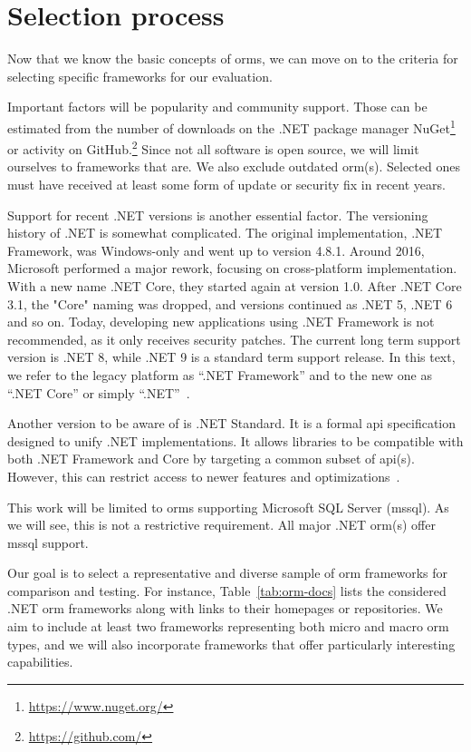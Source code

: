 \section{Selection process}
Now that we know the basic concepts of \acrshort{orm}s, we can move on to the criteria for selecting specific frameworks for our evaluation.

Important factors will be popularity and community support. Those can be estimated from the number of downloads on the .NET package manager NuGet\footnote{\url{https://www.nuget.org/}} or activity on GitHub.\footnote{\url{https://github.com/}} Since not all software is open source, we will limit ourselves to frameworks that are. We also  exclude outdated \acrshort{orm}(s). Selected ones must have received at least some form of update or security fix in recent years.

Support for recent .NET versions is another essential factor. The versioning history of .NET is somewhat complicated. The original implementation, .NET Framework, was Windows-only and went up to version 4.8.1. Around 2016, Microsoft performed a major rework, focusing on cross-platform implementation. With a new name .NET Core, they started again at version 1.0. After .NET Core 3.1, the "Core" naming was dropped, and versions continued as .NET 5, .NET 6 and so on. Today, developing new applications using .NET Framework is not recommended, as it only receives security patches. The current long term support version is .NET 8, while .NET 9 is a standard term support release. In this text, we refer to the legacy platform as ``.NET Framework'' and to the new one as ``.NET Core'' or simply ``.NET''~\cite{NETFrameworkVersions,NETversions}.

Another version to be aware of is .NET Standard. It is a formal \acrshort{api} specification designed to unify .NET implementations. It allows libraries to be compatible with both .NET Framework and Core by targeting a common subset of \acrshort{api}(s). However, this can restrict access to newer features and optimizations~\cite{NETStandard}.

This work will be limited to \acrshort{orm}s supporting Microsoft SQL Server (\acrshort{mssql}). As we will see, this is not a restrictive requirement. All major .NET \acrshort{orm}(s) offer \acrshort{mssql} support.

Our goal is to select a representative and diverse sample of \acrshort{orm} frameworks for comparison and testing. For instance, Table~\ref{tab:orm-docs} lists the considered .NET \acrshort{orm} frameworks along with links to their homepages or repositories. We aim to include at least two frameworks representing both micro and macro \acrshort{orm} types, and we will also incorporate frameworks that offer particularly interesting capabilities.


